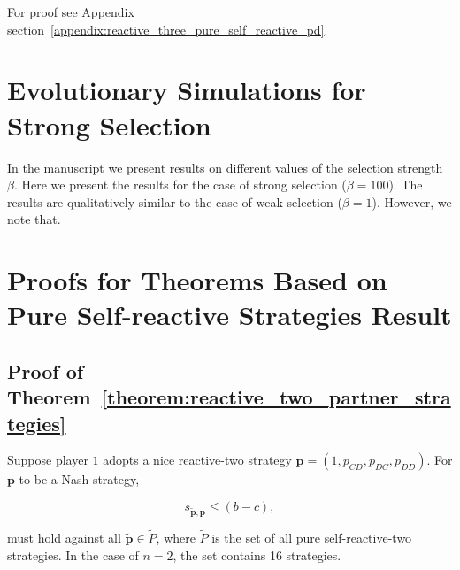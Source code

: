 \documentclass{article}
\theoremstyle{definition}
\begin{document}
For proof see Appendix section~\ref{appendix:reactive_three_pure_self_reactive_pd}.



\section{Evolutionary Simulations for Strong Selection}

In the manuscript we present results on different values of the selection
strength $\beta$. Here we present the results for the case of strong selection
($\beta=100$). The results are qualitatively similar to the case of weak selection
($\beta=1$). However, we note that.

\appendix


\section{Proofs for Theorems Based on Pure Self-reactive Strategies Result}\label{appendix:proofs_for_theorems_pure_self_reactive}


\subsection{Proof of Theorem~\ref{theorem:reactive_two_partner_strategies}}\label{appendix:reactive_two_pure_self_reactive}

Suppose player $1$ adopts a nice reactive-two strategy
$\mathbf{p}\!=\!(1, p_{CD}, p_{DC}, p_{DD})$. For $\mathbf{p}$ to be a Nash
strategy,

\begin{equation}
  s_{\mathbf{\tilde{p}}, \mathbf{p}} \leq (b - c),
\end{equation}

must hold against all \(\mathbf{\tilde{p}} \in \tilde{P}\), where \(\tilde{P}\) is the
set of all pure self-reactive-two strategies. In the case of $n=2$, the set
contains 16 strategies.
\end{document}
